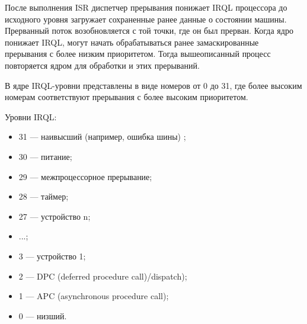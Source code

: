 После выполнения ISR диспетчер прерывания понижает IRQL процессора до исходного уровня загружает сохраненные ранее данные о состоянии машины.
Прерванный поток возобновляется с той точки, где он был прерван.
Когда ядро понижает IRQL, могут начать обрабатываться ранее замаскированные прерывания с более низким приоритетом.
Тогда вышеописанный процесс повторяется ядром для обработки и этих прерываний.

В ядре IRQL-уровни представлены в виде номеров от 0 до 31, где более высоким номерам соответствуют прерывания с более высоким приоритетом.

Уровни IRQL:
\begin{itemize}
	\item 31 --- наивысший (например, ошибка шины) ;
	\item 30 --- питание;
	\item 29 --- межпроцессорное прерывание;
	\item 28 --- таймер;
	\item 27 --- устройство n;
	\item ...;
	\item 3 --- устройство 1;
	\item 2 --- DPC (deferred procedure call)/dispatch);
	\item 1 --- APC (asynchronous procedure call);
	\item 0 --- низший.
\end{itemize}